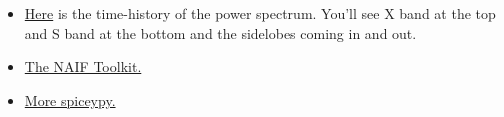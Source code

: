 \documentclass[crop=false,class=book]{standalone}
\begin{document}
\begin{itemize}[itemsep=0pt]
\begin{itemize}
{                                        parallelism-in-one-line/}
                                       {Parallelism in One Line.}
                        \end{itemize}
                        \item \href{https://www.youtube.com/%
                                    watch?time_continue=2&v=s-Xw6i61N9o}
                                   {Here}
                              is the time-history of the power spectrum.
                              You'll see X band at the top and S band at
                              the bottom and the sidelobes coming in and out.
                        \item \href{https://naif.jpl.nasa.gov/naif/toolkit.html}
                                   {The NAIF Toolkit.}
                        \item \href{http://spiceypy.readthedocs.io/en/%
                                    master/exampleone.html}
                                   {More spiceypy.}
                    \end{itemize}
\end{document}
